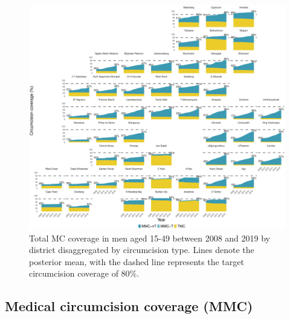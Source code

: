 \documentclass{article}
\begin{document}
\begin{appendix}

\begin{figure}[H]
	\centering
	\includegraphics[width = \linewidth]{Figures/suppmat/Coverage/Coverage_1549_District.pdf}
	\caption{Total MC coverage in men aged 15-49 between 2008 and 2019 by district disaggregated by circumcision type. Lines denote the posterior mean, with the dashed line represents the target circumcision coverage of 80\%.}
\end{figure}


\subsection{Medical circumcision coverage (MMC)}



\end{appendix}
\end{document}
